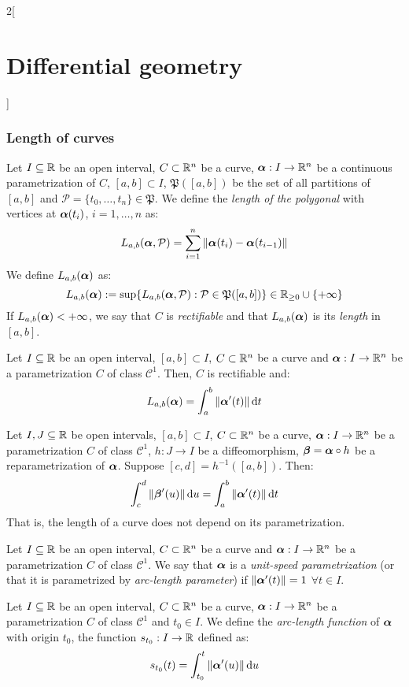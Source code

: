 \documentclass[../../../main.tex]{subfiles}
\begin{document}
\begin{multicols}{2}[\section{Differential geometry}]
  \subsubsection{Length of curves}
  \begin{definition}
    Let $I\subseteq\mathbb{R}$ be an open interval, $C\subset\mathbb{R}^n$ be a curve, $\boldsymbol{\mathrm{\alpha}}:I\rightarrow\mathbb{R}^n$ be a continuous parametrization of $C$, $[a,b]\subset I$, $\mathfrak{P}([a,b])$ be the set of all partitions of $[a,b]$ and $\mathcal{P}=\{t_0,\ldots,t_n\}\in\mathfrak{P}$. We define the \emph{length of the polygonal} with vertices at $\boldsymbol{\mathrm{\alpha}}(t_i)$, $i=1,\ldots,n$ as: $$L_{a,b}(\boldsymbol{\mathrm{\alpha}},\mathcal{P})=\sum_{i=1}^n\|\boldsymbol{\mathrm{\alpha}}(t_i)-\boldsymbol{\mathrm{\alpha}}(t_{i-1})\|$$ We define $L_{a,b}(\boldsymbol{\mathrm{\alpha}})$ as:
    $$L_{a,b}(\boldsymbol{\mathrm{\alpha}}):=\sup\{L_{a,b}(\boldsymbol{\mathrm{\alpha}},\mathcal{P}):\mathcal{P}\in\mathfrak{P}([a,b])\}\in\mathbb{R}_{\geq 0}\cup\{+\infty\}$$ If $L_{a,b}(\boldsymbol{\mathrm{\alpha}})<+\infty$, we say that $C$ is \emph{rectifiable} and that $L_{a,b}(\boldsymbol{\mathrm{\alpha}})$ is its \emph{length} in $[a,b]$.
  \end{definition}
  \begin{proposition}
    Let $I\subseteq\mathbb{R}$ be an open interval, $[a,b]\subset I$, $C\subset\mathbb{R}^n$ be a curve and $\boldsymbol{\mathrm{\alpha}}:I\rightarrow\mathbb{R}^n$ be a parametrization $C$ of class $\mathcal{C}^1$. Then, $C$ is rectifiable and: $$L_{a,b}(\boldsymbol{\mathrm{\alpha}})=\int_a^b\|\boldsymbol{\mathrm{\alpha}}'(t)\|\dd{t}$$
  \end{proposition}
  \begin{proposition}
    Let $I,J\subseteq\mathbb{R}$ be open intervals, $[a,b]\subset I$, $C\subset\mathbb{R}^n$ be a curve, $\boldsymbol{\mathrm{\alpha}}:I\rightarrow\mathbb{R}^n$ be a parametrization $C$ of class $\mathcal{C}^1$, $h:J\rightarrow I$ be a diffeomorphism, $\boldsymbol{\mathrm{\beta}}=\boldsymbol{\mathrm{\alpha}}\circ h$ be a reparametrization of $\boldsymbol{\mathrm{\alpha}}$. Suppose $[c,d]=h^{-1}([a,b])$. Then: $$\int_c^d\|\boldsymbol{\mathrm{\beta}}'(u)\|\dd{u}=\int_a^b\|\boldsymbol{\mathrm{\alpha}}'(t)\|\dd{t}$$ That is, the length of a curve does not depend on its parametrization.
  \end{proposition}
  \begin{definition}
    Let $I\subseteq\mathbb{R}$ be an open interval, $C\subset\mathbb{R}^n$ be a curve and $\boldsymbol{\mathrm{\alpha}}:I\rightarrow\mathbb{R}^n$ be a parametrization $C$ of class $\mathcal{C}^1$. We say that $\boldsymbol{\mathrm{\alpha}}$ is a \emph{unit-speed parametrization} (or that it is parametrized by \emph{arc-length parameter}) if $\|\boldsymbol{\mathrm{\alpha}}'(t)\|=1$ $\forall t\in I$.
  \end{definition}
  \begin{definition}
    Let $I\subseteq\mathbb{R}$ be an open interval, $C\subset\mathbb{R}^n$ be a curve, $\boldsymbol{\mathrm{\alpha}}:I\rightarrow\mathbb{R}^n$ be a parametrization $C$ of class $\mathcal{C}^1$ and $t_0\in I$. We define the \emph{arc-length function} of $\boldsymbol{\mathrm{\alpha}}$ with origin ${t_0}$, the function $s_{t_0}:I\rightarrow\mathbb{R}$ defined as: $$s_{t_0}(t)=\int_{t_0}^t\|\boldsymbol{\mathrm{\alpha}}'(u)\|\dd{u}$$

\end{definition}
\end{multicols}
\end{document}
